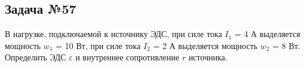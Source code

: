 \subsection{Задача №57}

В нагрузке, подключаемой к источнику ЭДС, при силе тока $I_1$ = 4 А выделяется мощность $w_1$ = 10 Вт, при силе тока $I_2$ = 2 А выделяется мощность $w_2$ = 8 Вт. Определить ЭДС $\varepsilon$ и внутреннее сопротивление $r$ источника.